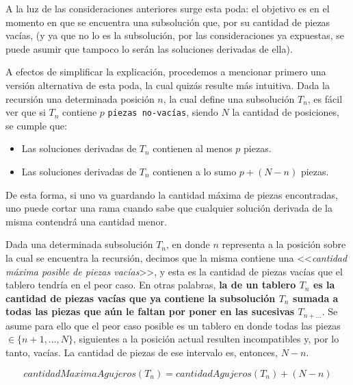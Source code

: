 \documentclass[11pt, a4paper, twoside]{article}
\begin{document}
\begin{paragraph}
A la luz de las consideraciones anteriores surge esta poda: el objetivo es
 en el momento en que se encuentra una
subsolución que, por su cantidad de piezas vacías,  (y ya que no lo es la subsolución, por las consideraciones
ya expuestas, se puede asumir que tampoco lo serán las soluciones derivadas de
ella).

\begin{center}
\begin{minipage}[h]{0.8\textwidth}
\begin{aclaracion}

A efectos de simplificar la explicación, procedemos a mencionar primero una
versión alternativa de esta poda, la cual quizás resulte más intuitiva. Dada la
recursión una determinada posición $n$, la cual define una subsolución $T_n$, es
fácil ver que si $T_n$ contiene $p$ \texttt{piezas no-vacías}, siendo $N$ la
cantidad de posiciones, se cumple que:

\begin{itemize}
  \item Las soluciones derivadas de $T_n$ contienen al menos $p$ piezas.
  \item Las soluciones derivadas de $T_n$ contienen a lo sumo $p + (N - n)$ piezas.
\end{itemize}

De esta forma, si uno va guardando la cantidad máxima de piezas encontradas, uno
puede cortar una rama cuando sabe que cualquier solución derivada de la misma
contendrá una cantidad menor.

\end{aclaracion}
\vspace{1em}
\end{minipage}
\end{center}

\begin{definicion}

Dada una determinada subsolución $T_n$, en donde $n$ representa a la posición
sobre la cual se encuentra la recursión, decimos que la misma contiene una
<<\emph{cantidad máxima posible de piezas vacías}>>, y esta es la cantidad de
piezas vacías que el tablero tendría en el peor caso. En otras palabras, \textbf{la
 de un tablero $T_n$ es la cantidad de piezas
vacías que ya contiene la subsolución $T_n$ sumada a todas las piezas que aún
le faltan por poner en las sucesivas $T_{n+\dots}$}. Se asume para ello que el
peor caso posible es un tablero en donde todas las piezas $\in \{n+1,...,N\}$,
siguientes a la posición actual resulten incompatibles y, por lo tanto,
vacías. La cantidad de piezas de ese intervalo es, entonces, $N-n$.

\[
cantidadMaximaAgujeros(T_n) = cantidadAgujeros(T_n) + (N-n)
\]

\end{definicion}

\end{paragraph}
\end{document}
